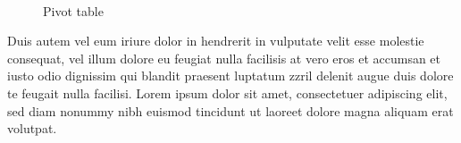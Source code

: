 \documentclass[10pt]{scrartcl}
\begin{document}
\clearpage
\begin{wrapfigure}{r}{0.52\textwidth}
{ \centering %
~%
\\ }
\vspace{-5pt}
\caption{Pivot table}
\vspace{-23pt}
\end{wrapfigure}
Duis autem vel eum iriure dolor in hendrerit in vulputate velit esse molestie consequat, vel illum dolore eu feugiat nulla facilisis at vero eros et accumsan et iusto odio dignissim qui blandit praesent luptatum zzril delenit augue duis dolore te feugait nulla facilisi. Lorem ipsum dolor sit amet, consectetuer adipiscing elit, sed diam nonummy nibh euismod tincidunt ut laoreet dolore magna aliquam erat volutpat.\\[8pt]
\end{document}
